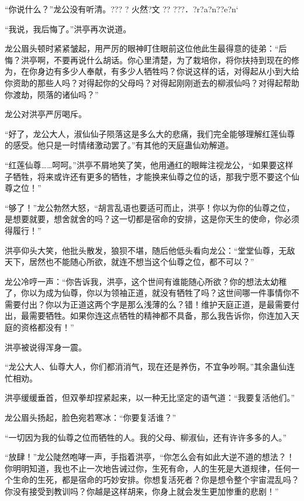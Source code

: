 
\begin{this_body}

“你说什么？”龙公没有听清。??? ? 火然?文 ?? ???．?r?a?n??e?n`

“我说，我后悔了。”洪亭再次说道。

龙公眉头顿时紧紧皱起，用严厉的眼神盯住眼前这位他此生最得意的徒弟：“后悔？洪亭啊，不要再说什么胡话。你心里清楚，为了栽培你，将你扶持到现在的修为，在你身边有多少人奉献，有多少人牺牲吗？你说这样的话，对得起从小到大给你资助的那些人吗？对得起你的父母吗？对得起刚刚逝去的柳淑仙吗？对得起帮助你渡劫，陨落的诸仙吗？”

龙公对洪亭严厉喝斥。

“好了，龙公大人，淑仙仙子陨落这是多么大的悲痛，我们完全能够理解红莲仙尊的感受。他只是一时情绪激动罢了。”有其他的天庭蛊仙劝解道。

“红莲仙尊……呵呵。”洪亭不屑地笑了笑，他用通红的眼眸注视龙公，“如果要这样子牺牲，将来或许还有更多的牺牲，才能换来仙尊之位的话，那我宁愿不要这个仙尊之位！”

“够了！”龙公勃然大怒，“胡言乱语也要适可而止，洪亭！你以为你的仙尊之位，是想要就要，想舍就舍的吗？这一切都是宿命的安排，这是你天生的使命，你必须得履行！”

洪亭仰头大笑，他批头散发，狼狈不堪，随后他低头看向龙公：“堂堂仙尊，无敌天下，居然也不能随心所欲，就连不想当这个仙尊之位，都不可以？”

龙公冷哼一声：“你告诉我，洪亭，这个世间有谁能随心所欲？你的想法太幼稚了，你以为成为仙尊，你以为领袖正道，就没有牺牲了吗？这世间哪一件事情你不需要付出？你以为正道这两个字是那么浅薄的么？错！维护天庭正道，是最需要付出，最需要牺牲。如果你连这点牺牲的精神都不具备，那么我告诉你，你连加入天庭的资格都没有！”

洪亭被说得浑身一震。

“龙公大人、仙尊大人，你们都消消气，现在还是养伤，不宜争吵啊。”其余蛊仙连忙相劝。

洪亭缓缓垂首，但双拳却捏紧起来，以一种无比坚定的语气道：“我要复活他们。”

龙公眉头扬起，脸色宛若寒冰：“你要复活谁？”

“一切因为我的仙尊之位而牺牲的人。我的父母、柳淑仙，还有许许多多的人。”

“放肆！”龙公陡然咆哮一声，手指着洪亭，“你怎么会有如此大逆不道的想法？！你明明知道，我也不止一次地告诫过你，生死有命，人的生死是大道规律，任何一个生命的生死，都是宿命的巧妙安排。你想复活死者？你是想令整个宇宙混乱吗？你没有接受到教训吗？你越是这样胡来，你身上就会发生更加惨重的悲剧！”


\end{this_body}
